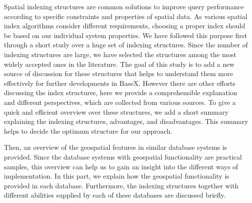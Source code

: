 \documentclass[a4paper,12pt]{article}
\begin{document}
Spatial indexing structures are common solutions to improve query performance according to specific constraints and properties of spatial data.
As various spatial index algorithms consider different requirements, choosing a proper index should be based on our individual system properties.
We have followed this purpose first through a short study over a huge set of indexing structures.
Since the number of indexing structures are large, 
we have selected the structures among the most widely accepted ones in the literature.
The goal of this study is to add a new source of discussion 
for these structures that helps to understand them more effectively for further developments in BaseX. 
However there are other efforts discussing the index structures, 
here we provide a comprehensible explanation and different perspectives, which are collected from various sources.
To give a quick and efficient overview over these structures, 
we add a short summary explaining the indexing structures, advantages, and disadvantages.
This summary helps to decide the optimum structure for our approach. 

Then, an overview of the geospatial features in similar database systems is provided. Since the database systems with geospatial functionality are practical samples, this overview can help us to gain an insight into the different ways of implementation. %
In this part, we explain how the geospatial functionality is provided in each database.
Furthermore, the indexing structures together with different abilities
supplied by each of these databases are discussed briefly.
\end{document}
